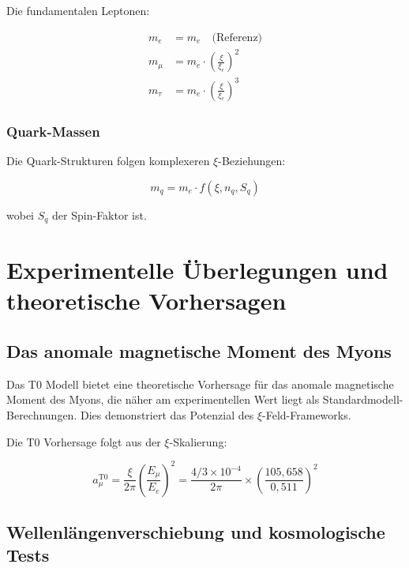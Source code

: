 \documentclass[12pt,a4paper]{report}
\begin{document}
	Die fundamentalen Leptonen:
	
	\begin{align}
		m_e &= m_e \quad \text{(Referenz)} \\
		m_\mu &= m_e \cdot \left(\frac{\xi}{\xi_e}\right)^2 \\
		m_\tau &= m_e \cdot \left(\frac{\xi}{\xi_e}\right)^3
	\end{align}
	
	\subsection{Quark-Massen}
	
	Die Quark-Strukturen folgen komplexeren $\xi$-Beziehungen:
	
	\begin{equation}
		m_q = m_e \cdot f(\xi, n_q, S_q)
	\end{equation}
	
	wobei $S_q$ der Spin-Faktor ist.
	
	\chapter{Experimentelle Überlegungen und theoretische Vorhersagen}
	
	\section{Das anomale magnetische Moment des Myons}
	
	\begin{experimentell}
		Das T0 Modell bietet eine theoretische Vorhersage für das anomale magnetische Moment des Myons, die näher am experimentellen Wert liegt als Standardmodell-Berechnungen. Dies demonstriert das Potenzial des $\xi$-Feld-Frameworks.
	\end{experimentell}
	
	Die T0 Vorhersage folgt aus der $\xi$-Skalierung:
	
	\begin{equation}
		a_\mu^{\text{T0}} = \frac{\xi}{2\pi} \left(\frac{E_\mu}{E_e}\right)^2 = \frac{4/3 \times 10^{-4}}{2\pi} \times \left(\frac{105,658}{0,511}\right)^2
	\end{equation}
	
	\section{Wellenlängenverschiebung und kosmologische Tests}
	
\end{document}
